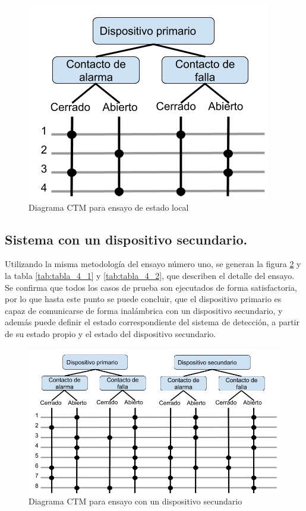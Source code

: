 \begin{figure}[ht]
	\centering
	\includegraphics[scale=.5]{./Figures/Capitulo4/Figura_J.png}
	\caption{Diagrama CTM para ensayo de estado local}
	\label{fig:figura_j}
\end{figure}

\subsection{Sistema con un dispositivo secundario.}

Utilizando la misma metodología del ensayo número uno, se generan la figura \ref{fig:figura_k} y la tabla \ref{tab:tabla_4_1} y \ref{tab:tabla_4_2}, que describen el detalle del ensayo. Se confirma que todos los casos de prueba son ejecutados de forma satisfactoria, por lo que hasta este punto se puede concluir, que el dispositivo primario es capaz de comunicarse de forma inalámbrica con un dispositivo secundario, y además puede definir el estado correspondiente del sistema de detección, a partir de su estado propio y el estado del dispositivo secundario. 

\begin{figure}[ht]
	\centering
	\includegraphics[scale=.3]{./Figures/Capitulo4/Figura_K.png}
	\caption{Diagrama CTM para ensayo con un dispositivo secundario }
	\label{fig:figura_k}
\end{figure}


